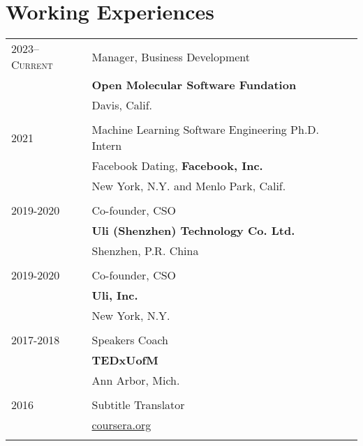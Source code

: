 \documentclass[letterpaper,10pt]{article}
\begin{document}
\section{Working Experiences}
\begin{longtable}{p{} p{} }
\textsc{2023--Current} & Manager, Business Development \\
& \textbf{Open Molecular Software Fundation} \\
& Davis, Calif. \\\\
\textsc{2021} & Machine Learning Software Engineering Ph.D. Intern\\
 & Facebook Dating, \textbf{Facebook, Inc.}\\
 & New York, N.Y. and Menlo Park, Calif.\\\\
\textsc{2019-2020} & Co-founder, CSO\\
                 & \textbf{Uli (Shenzhen) Technology Co. Ltd.}\\
                 & Shenzhen, P.R. China\\\\
\textsc{2019-2020} & Co-founder, CSO\\
                 & \textbf{Uli, Inc.}\\
                 & New York, N.Y.\\\\
\textsc{2017-2018} & Speakers Coach \\
 & \textbf{TEDxUofM}\\
 & Ann Arbor, Mich.\\\\

 \textsc{2016} & Subtitle Translator\\
 & \url{coursera.org} \\\\
\end{longtable}

\vspace{-10}
\end{document}
